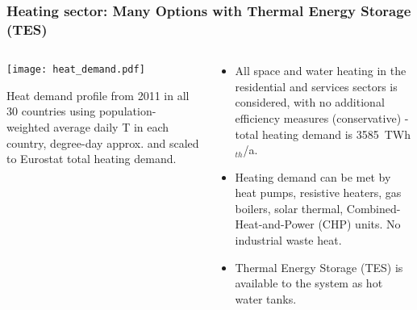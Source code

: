 \documentclass[10pt,aspectratio=169,dvipsnames]{beamer}
\def\th{${}_{th}$}
\let\olditem\item
\renewcommand{\item}{%
\olditem\vspace{5pt}}
\begin{document}
\begin{frame}
  \frametitle{Heating sector: Many Options with Thermal Energy Storage (TES)}
\begin{columns}[T]
\begin{column}{7cm}

    \texttt{[image: heat\_demand.pdf]}

    Heat demand profile from 2011 in all 30 countries using population-weighted average daily T in each country, degree-day approx. and scaled to Eurostat total heating demand.


\end{column}
\begin{column}{7cm}
  \begin{itemize}
  \item All space and water heating in the residential and services
    sectors is considered, with no additional efficiency measures
    (conservative) - total heating demand is  3585~TWh\th/a.
  \item Heating demand can be met by heat pumps, resistive heaters, gas boilers, solar thermal, Combined-Heat-and-Power (CHP) units. No industrial waste heat.
    \item Thermal Energy Storage (TES) is available to the system as hot water tanks.
  \end{itemize}
\end{column}
\end{columns}

\end{frame}
\end{document}
